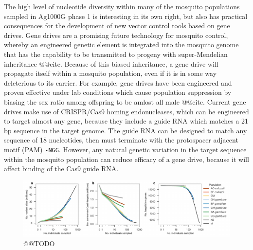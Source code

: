 \documentclass[a4paper,11pt,abstracton,hidelinks]{scrartcl}
\begin{document}
The high level of nucleotide diversity within many of the mosquito populations sampled in Ag1000G phase 1 is interesting in its own right, but also has practical consequences for the development of new vector control tools based on gene drives.
%
Gene drives are a promising future technology for mosquito control, whereby an engineered genetic element is integrated into the mosquito genome that has the capability to be transmitted to progeny with super-Mendelian inheritance @@cite.
%
Because of this biased inheritance, a gene drive will propagate itself within a mosquito population, even if it is in some way deleterious to its carrier.
%
For example, gene drives have been engineered and proven effective under lab conditions which cause population suppression by biasing the sex ratio among offspring to be amlost all male @@cite.
%
Current gene drives make use of CRISPR/Cas9 homing endonucleases, which can be engineered to target almost any gene, because they include a guide RNA which matches a 21 bp sequence in the target genome.
%
The guide RNA can be designed to match any sequence of 18 nucleotides, then must terminate with the protospacer adjacent motif (PAM) \texttt{-NGG}.
%
However, any natural genetic variation in the target sequence within the mosquito population can reduce efficacy of a gene drive, because it will affect binding of the Cas9 guide RNA.
%


\begin{figure}[t!]
\centering
\includegraphics[width=1.1\textwidth,center]{artwork/chapter4/cas9_targets.pdf}
\caption{@@TODO
%
}
\label{fig:cas9}
\end{figure}
\end{document}
